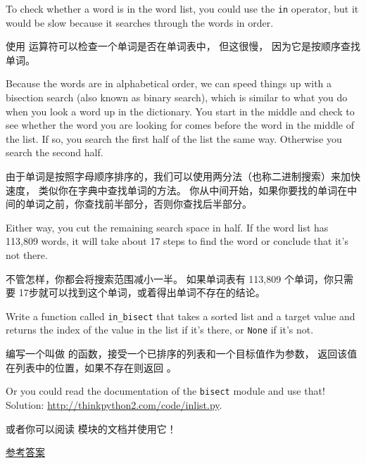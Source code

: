 \begin{exercise}
\label{wordlist1}
\label{bisection}
  
  
  

To check whether a word is in the word list, you could use
the {\tt in} operator, but it would be slow because it searches
through the words in order.

使用  运算符可以检查一个单词是否在单词表中， 但这很慢， 因为它是按顺序查找单词。

Because the words are in alphabetical order, we can speed things up
with a bisection search (also known as binary search), which is
similar to what you do when you look a word up in the dictionary.  You
start in the middle and check to see whether the word you are looking
for comes before the word in the middle of the list.  If so, you
search the first half of the list the same way.  Otherwise you search
the second half.

由于单词是按照字母顺序排序的，我们可以使用两分法（也称二进制搜索）来加快速度，
类似你在字典中查找单词的方法。 你从中间开始，如果你要找的单词在中间的单词之前，你查找前半部分，否则你查找后半部分。

Either way, you cut the remaining search space in half.  If the
word list has 113,809 words, it will take about 17 steps to
find the word or conclude that it's not there.

不管怎样，你都会将搜索范围减小一半。
如果单词表有 113,809 个单词，你只需要 17步就可以找到这个单词，或着得出单词不存在的结论。

Write a function called \verb"in_bisect" that takes a sorted list
and a target value and returns the index of the value
in the list if it's there, or {\tt None} if it's not.

编写一个叫做  的函数，接受一个已排序的列表和一个目标值作为参数，
返回该值在列表中的位置，如果不存在则返回  。

  

Or you could read the documentation of the {\tt bisect} module
and use that!  Solution: \url{http://thinkpython2.com/code/inlist.py}.

或者你可以阅读  模块的文档并使用它！

\href{http://thinkpython2.com/code/inlist.py}{参考答案}

\end{exercise}

